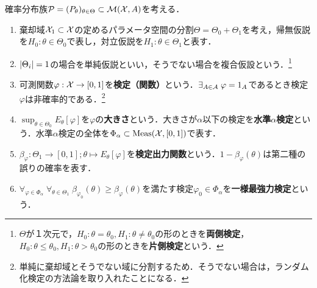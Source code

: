 \documentclass[uplatex,dvipdfmx]{jsreport}
\begin{document}
\begin{definition}
    確率分布族$\mathcal{P}=(P_\theta)_{\theta\in\Theta}\subset\mathcal{M}(\mathcal{X},A)$を考える．
    \begin{enumerate}
        \item 棄却域$\mathcal{X}_1\subset\mathcal{X}$の定めるパラメータ空間の分割$\Theta=\Theta_0+\Theta_1$を考え，帰無仮説を$H_0:\theta\in\Theta_0$で表し，対立仮説を$H_1:\theta\in\Theta_1$と表す．
        \item $\lvert\Theta_i\rvert=1$の場合を単純仮説といい，そうでない場合を複合仮設という．\footnote{$\Theta$が１次元で，$H_0:\theta=\theta_0,H_1:\theta\ne\theta_0$の形のときを\textbf{両側検定}，$H_0:\theta\le\theta_0,H_1:\theta>\theta_0$の形のときを\textbf{片側検定}という．}
        \item 可測関数$\varphi:\mathcal{X}\to[0,1]$を\textbf{検定（関数）}という．$\exists_{A\in\mathcal{A}}\;\varphi=1_A$であるとき検定$\varphi$は非確率的である．\footnote{単純に棄却域とそうでない域に分割するため．そうでない場合は，ランダム化検定の方法論を取り入れたことになる．}
        \item $\sup_{\theta\in\Theta_0}E_\theta[\varphi]$を$\varphi$の\textbf{大きさ}という．大きさが$\alpha$以下の検定を\textbf{水準$\alpha$検定}という．水準$\alpha$検定の全体を$\Phi_\alpha\subset\mathrm{Meas}(\mathcal{X},[0,1])$で表す．
        \item $\beta_\varphi:\Theta_1\to[0,1];\theta\mapsto E_\theta[\varphi]$を\textbf{検定出力関数}という．$1-\beta_\varphi(\theta)$は第二種の誤りの確率を表す．
        \item $\forall_{\varphi\in\Phi_\alpha}\;\forall_{\theta\in\Theta_1}\;\beta_{\varphi_0}(\theta)\ge\beta_\varphi(\theta)$を満たす検定$\varphi_0\in\Phi_\alpha$を\textbf{一様最強力検定}という．
    \end{enumerate}
\end{definition}
\end{document}
